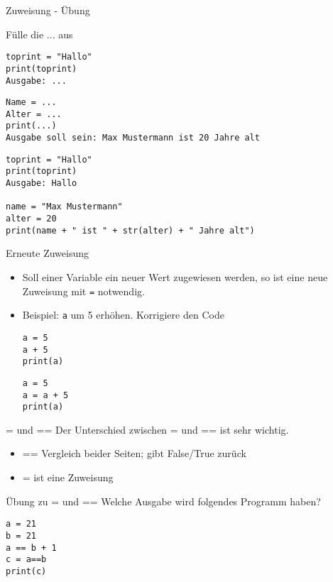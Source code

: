 \begin{frame}[fragile]{Zuweisung - Übung}

Fülle die ... aus
\begin{lstlisting}
toprint = "Hallo"
print(toprint)
Ausgabe: ...
\end{lstlisting}
\begin{lstlisting}
Name = ...
Alter = ...
print(...)
Ausgabe soll sein: Max Mustermann ist 20 Jahre alt
\end{lstlisting}
\pause{}
\begin{lstlisting}
toprint = "Hallo"
print(toprint)
Ausgabe: Hallo

name = "Max Mustermann"
alter = 20
print(name + " ist " + str(alter) + " Jahre alt")
\end{lstlisting}

\end{frame}



\begin{frame}[fragile]{Erneute Zuweisung}
\begin{itemize}
	\item Soll einer Variable ein neuer Wert zugewiesen werden, so ist eine neue Zuweisung mit  \texttt{=} notwendig.
	\item Beispiel: \texttt{a} um 5 erhöhen. Korrigiere den Code
	\begin{lstlisting}
a = 5
a + 5
print(a)
	\end{lstlisting}
	\pause{}
	\begin{lstlisting}
a = 5
a = a + 5
print(a)
	\end{lstlisting}
	
\end{itemize}
\end{frame}






\begin{frame}[fragile]{= und == }
Der Unterschied zwischen = und == ist sehr wichtig.
\begin{itemize}
\item == Vergleich beider Seiten; gibt False/True zurück
\item = ist eine Zuweisung 
\end{itemize}
\end{frame}

\begin{frame}[fragile]{Übung zu = und == }
Welche Ausgabe wird folgendes Programm haben?
	\begin{lstlisting}
a = 21
b = 21
a == b + 1
c = a==b
print(c)
	\end{lstlisting}
\end{frame}


